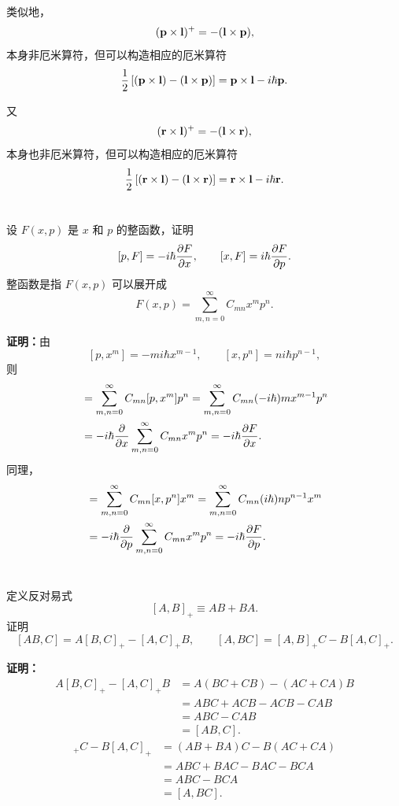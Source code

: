 \documentclass[12pt,a4paper]{article}
\begin{document}
类似地，
\[
(\vb{p}\times\vb{l})^{+}=-(\vb{l}\times\vb{p}),
\]
本身非厄米算符，但可以构造相应的厄米算符
\[
\frac{1}{2}\left[(\vb{p}\times\vb{l})-(\vb{l}\times\vb{p})\right]
=
\vb{p}\times\vb{l}-i\hbar \vb{p}.
\]

又
\[
(\vb{r}\times\vb{l})^{+}=-(\vb{l}\times\vb{r}),
\]
本身也非厄米算符，但可以构造相应的厄米算符
\[
\frac{1}{2}\left[(\vb{r}\times\vb{l})-(\vb{l}\times\vb{r})\right]
=
\vb{r}\times\vb{l}-i\hbar \vb{r}.
\]

\section{}
设 \(F(x,p)\) 是 \(x\) 和 \(p\) 的整函数，证明
\[
[p,F]=-i\hbar \pdv{F}{x},
\qquad
[x,F]=i\hbar \pdv{F}{p}.
\]
整函数是指 \(F(x,p)\) 可以展开成
\[
F(x,p)=\sum_{m,n=0}^{\infty}C_{mn}x^{m}p^{n}.
\]

\vspace{0.5cm}

\noindent\textbf{证明：}由
\[
[p,x^{m}]=-mi\hbar x^{m-1},
\qquad
[x,p^{n}]=ni\hbar p^{n-1},
\]
则
\begin{align*}
    [p,F]
    &=
    \sum_{m,n=0}^{\infty} C_{mn}[p,x^{m}]p^{n}
    =
    \sum_{m,n=0}^{\infty} C_{mn}(-i\hbar)mx^{m-1}p^{n}\\
    &=
    -i\hbar \pdv{x}
    \sum_{m,n=0}^{\infty} C_{mn}x^{m}p^{n}
    =
    -i\hbar \pdv{F}{x}.
\end{align*}
同理，
\begin{align*}
    [x,F]
    &=
    \sum_{m,n=0}^{\infty} C_{mn}[x,p^{n}]x^{m}
    =
    \sum_{m,n=0}^{\infty} C_{mn}(i\hbar)np^{n-1}x^{m}\\
    &=
    -i\hbar \pdv{p}\sum_{m,n=0}^{\infty} C_{mn}x^{m}p^{n}
    =
    -i\hbar \pdv{F}{p}.
\end{align*}

\section{}
定义反对易式
\[
[A,B]_{+}\equiv AB+BA.
\]
证明
\[
[AB,C]=A[B,C]_{+}-[A,C]_{+}B,
\qquad
[A,BC]=[A,B]_{+}C-B[A,C]_{+}.
\]

\vspace{0.5cm}

\noindent\textbf{证明：}
\begin{align*}
    A[B,C]_{+}-[A,C]_{+}B
    &=
    A(BC+CB)-(AC+CA)B\\
    &=
    ABC+ACB-ACB-CAB\\
    &=
    ABC-CAB\\
    &=
    [AB,C].
\end{align*}
\begin{align*}
    [A,B]_{+}C-B[A,C]_{+}
    &=
    (AB+BA)C-B(AC+CA)\\
    &=
    ABC+BAC-BAC-BCA\\
    &=
    ABC-BCA\\
    &=
    [A,BC].
\end{align*}
\end{document}
